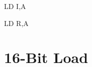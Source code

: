 \documentclass[twoside,openright,a4paper]{book}
\begin{document}
\begin{instrtable}
	\begin{instruction}{LD I,A} 
			\Flags{\FN}{\FN}{\FN}{\FN}{\FN}{\FN}
		\SkipToOpCode
	\end{instruction}

	\begin{lastinstruction}{LD R,A} 
			\Flags{\FN}{\FN}{\FN}{\FN}{\FN}{\FN}
		\SkipToOpCode
	\end{lastinstruction}

\end{instrtable}


\section{16-Bit Load}
\end{document}
